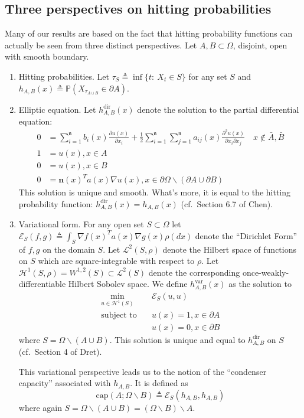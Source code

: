 \documentclass[english, aip, jcp, priprint, graphicx,floatfix]{revtex4-1}
\theoremstyle{plain}
\theoremstyle{definition}
\theoremstyle{plain}
\newcommand{\dimension}{{\mathfrak{n}}}
\newcommand{\capac}[2]{\mathrm{cap}\left(#1;#2\right)}
\begin{document}
\subsection{Three perspectives on hitting probabilities}

Many of our results are based on the fact that hitting probability functions can actually be seen from three distinct perspectives.  Let $A,B\subset \Omega$, disjoint, open with smooth boundary.  

\begin{enumerate}
    \item Hitting probabilities.  Let $\tau_S \triangleq \inf\{t:\ X_t \in S\}$ for any set $S$ and $h_{A,B}(x) \triangleq \mathbb{P}(X_{\tau_{A\cup B}}\in \partial A)$.
    
    \item Elliptic equation.  Let $h^\mathrm{dir}_{A,B}(x)$ denote the solution to the partial differential equation:
    \begin{align*}
    0 &= \sum_{i = 1}^\dimension b_i (x) \frac{\partial u
        (x)}{\partial x_i} + \frac{1}{2} \sum_{i = 1}^\dimension \sum_{j = 1}^\dimension a_{ij} (x)
        \frac{\partial^2 u (x)}{\partial x_i \partial x_j}\quad x\notin \bar A,\bar B\\
    1 &= u(x),x\in A \\ 
    0 &= u(x) ,x\in B \\
    0 &= \mathbf{n}(x)^Ta(x)\nabla u(x), x \in \partial{\Omega} \backslash (\partial A \cup \partial B)
    \end{align*}
    This solution is unique and smooth.\cite{lieberman1986mixed}  What's more, it is equal to the hitting probability function: $h^\mathrm{dir}_{A,B}(x)=h_{A,B}(x)$ (cf.\ Section 6.7 of Chen\cite{chen2012symmetric}).

    \item Variational form.  For any open set $S\subset \Omega$ let $\mathscr{E}_{S}(f,g)\triangleq \int_S \nabla f(x)^T a(x) \nabla g(x) \rho(dx)$ denote the ``Dirichlet Form'' of $f,g$ on the domain $S$.  Let $\mathscr L^2(S,\rho)$ denote the Hilbert space of functions on $S$ which are square-integrable with respect to $\rho$.  Let $\mathcal{H}^1(S,\rho)=W^{1,2}(S) \subset \mathscr{L}^2(S)$ denote the corresponding once-weakly-differentiable Hilbert Sobolev space.  We define $h^\mathrm{var}_{A,B}(x)$ as the solution to 
    \begin{align*}
    \min_{u \in \mathcal H^1(S)} \quad & \mathscr{E}_S(u,u) \\
    \mbox{subject to} \quad & u(x)=1,x\in \partial A \\
     & u(x)=0,x\in \partial B
    \end{align*}
    where $S=\Omega \backslash (A\cup B)$.  This solution is unique and equal to $h^\mathrm{dir}_{A,B}$ on $S$ (cf.\ Section 4 of Dret\cite{dret2016partial}).  

    This variational perspective leads us to the notion of the ``condenser capacity'' associated with $h_{A,B}$.  It is defined as 
    \[
    \capac{A}{\Omega \backslash B} \triangleq \mathscr{E}_S(h_{A,B},h_{A,B})
    \]
    where again $S=\Omega \backslash (A\cup B)=(\Omega \backslash B) \backslash A$.  
\end{enumerate}
\end{document}

